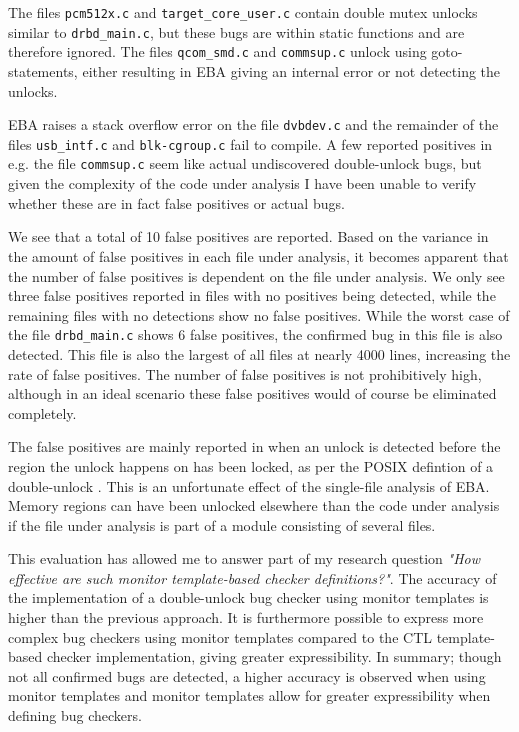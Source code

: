 \newpar The files \texttt{pcm512x.c} and \texttt{target\_core\_user.c} contain double mutex unlocks similar to \texttt{drbd\_main.c}, but these bugs are within static functions and are therefore ignored. The files \texttt{qcom\_smd.c} and \texttt{commsup.c} unlock using goto-statements, either resulting in EBA giving an internal error or not detecting the unlocks. 

\newpar EBA raises a stack overflow error on the file \texttt{dvbdev.c} and the remainder of the files \texttt{usb\_intf.c} and \texttt{blk-cgroup.c} fail to compile. A few reported positives in e.g. the file \texttt{commsup.c} seem like actual undiscovered double-unlock bugs, but given the complexity of the code under analysis I have been unable to verify whether these are in fact false positives or actual bugs. 

\newpar We see that a total of 10 false positives are reported. Based on the variance in the amount of false positives in each file under analysis, it becomes apparent that the number of false positives is dependent on the file under analysis. We only see three false positives reported in files with no positives being detected, while the remaining files with no detections show no false positives. While the worst case of the file \texttt{drbd\_main.c} shows 6 false positives, the confirmed bug in this file is also detected. This file is also the largest of all files at nearly 4000 lines, increasing the rate of false positives. The number of false positives is not prohibitively high, although in an ideal scenario these false positives would of course be eliminated completely. 

\newpar The false positives are mainly reported in when an unlock is detected before the region the unlock happens on has been locked, as per the POSIX defintion of a double-unlock \cite{unlockPOSIX}. This is an unfortunate effect of the single-file analysis of EBA. Memory regions can have been unlocked elsewhere than the code under analysis if the file under analysis is part of a module consisting of several files. 

\newpar This evaluation has allowed me to answer part of my research question \textit{"How effective are such monitor template-based checker definitions?"}. The accuracy of the implementation of a double-unlock bug checker using monitor templates is higher than the previous approach. It is furthermore possible to express more complex bug checkers using monitor templates compared to the CTL template-based checker implementation, giving greater expressibility. In summary; though not all confirmed bugs are detected, a higher accuracy is observed when using monitor templates and monitor templates allow for greater expressibility when defining bug checkers. 